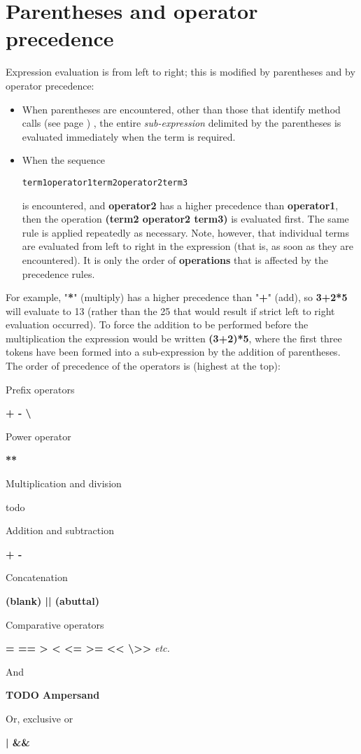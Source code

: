 \section{Parentheses and operator precedence}\label{refpreced}
 Expression evaluation is from left to right; this is modified by
parentheses and by operator precedence:
\begin{itemize}
\item 
When parentheses are encountered, other than those that identify
 method calls (see page \pageref{refmethcon}) , the entire \emph{sub-expression}
delimited by the parentheses is evaluated immediately when the term is
required.
\item When the sequence
\begin{alltt}
term1 operator1 term2 operator2 term3
\end{alltt}
is encountered, and \textbf{operator2} has a higher
precedence than \textbf{operator1}, then the
operation \textbf{(term2 operator2 term3)} is evaluated
first.
The same rule is applied repeatedly as necessary.
 Note, however, that individual terms are evaluated from left to
right in the expression (that is, as soon as they are encountered).  It
is only the order of \textbf{operations} that is affected by the
precedence rules.
\end{itemize}
For example, "\textbf{*}" (multiply) has a higher precedence
than "\textbf{+}" (add), so \textbf{3+2*5} will evaluate to
13 (rather than the 25 that would result if strict left to right
evaluation occurred).
To force the addition to be performed before the multiplication the
expression would be written \textbf{(3+2)*5}, where the first three
tokens have been formed into a sub-expression by the addition of
parentheses.
 The order of precedence of the operators is (highest at the top):
\begin{description}
\item{Prefix operators}

\textbf{+  -  \textbackslash }
\item{Power operator}

\textbf{**}
\item{Multiplication and division}

todo
\item{Addition and subtraction}

\textbf{+  -}
\item{Concatenation}

\textbf{(blank)  ||  (abuttal)}
\item{Comparative operators}

\textbf{=  ==  >  <  <= >=  <<  \textbackslash >> } \emph{etc.}
\item{And}

\textbf{TODO Ampersand}
\item{Or, exclusive or}

\textbf{|  \&\&}
\end{description}
